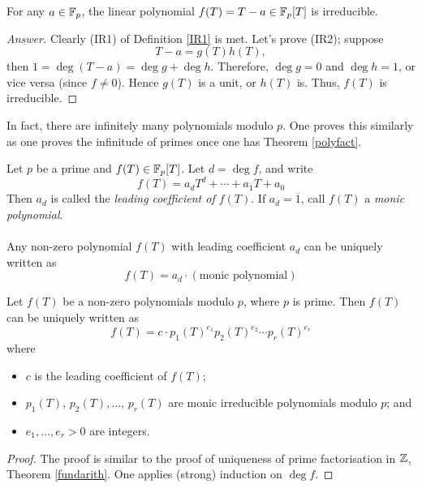 
\begin{example}
For any $a \in \mathbb F_p$, the linear polynomial $f(T) = T - a \in \mathbb F_p[T]$ is irreducible.
\end{example}
\begin{proof}[Answer]
Clearly (IR1) of Definition \ref{IR1} is met. Let's prove (IR2); suppose
\[T - a = g(T)h(T),\]
then $1 = \deg (T - a) = \deg g + \deg h$. Therefore, $\deg g = 0$ and $\deg h = 1$, or vice versa (since $f \neq 0$). Hence $g(T)$ is a unit, or $h(T)$ is. Thus, $f(T)$ is irreducible.
\end{proof}

\vspace*{1em}

In fact, there are infinitely many polynomials modulo $p$. One proves this similarly as one proves the infinitude of primes once one has Theorem \ref{polyfact}.

\vspace*{2em}

\begin{definition}
Let $p$ be a prime and $f(T) \in \mathbb F_p[T]$. Let $d = \deg f$, and write
\[f(T) = a_d T^d + \cdots + a_1 T + a_0\]
Then $a_d$ is called the \emph{leading coefficient of $f(T)$}. If $a_d = \overline{1}$, call $f(T)$ a \emph{monic polynomial}.\\
\\
Any non-zero polynomial $f(T)$ with leading coefficient $a_d$ can be uniquely written as 
\[f(T) = a_d\cdot (\text{monic polynomial})\]
\end{definition}

\vspace*{1em}

\begin{theorem}\label{polyfact}
Let $f(T)$ be a non-zero polynomials modulo $p$, where $p$ is prime. Then $f(T)$ can be uniquely written as
\[f(T) = c\cdot p_1(T)^{e_1}p_2(T)^{e_2}\cdots p_r(T)^{e_r}\]
where
\begin{itemize}
\item $c$ is the leading coefficient of $f(T)$;
\item $p_1(T),\,p_2(T),\ldots,\,p_r(T)$ are monic irreducible polynomials modulo $p$; and 
\item $e_1,\ldots,e_r>0$ are integers.
\end{itemize}
\end{theorem}
\begin{proof}
The proof is similar to the proof of uniqueness of prime factorisation in $\mathbb Z$, Theorem \ref{fundarith}. One applies (strong) induction on $\deg f$.
\end{proof}

